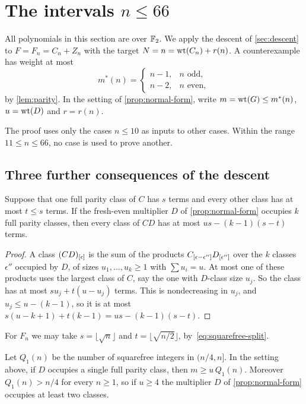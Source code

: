 \section{The intervals \texorpdfstring{$n\le66$}{n <= 66}}\label{sec:small}

All polynomials in this section are over $\mathbb{F}_2$. We apply the descent of \cref{sec:descent} to $F=F_n=C_n+Z_n$ with the target $N=n=\operatorname{wt}(C_n)+r(n)$. A counterexample has weight at most
\[
 m^*(n)=\begin{cases}n-1,&n\text{ odd},\\ n-2,&n\text{ even},\end{cases}
\]
by \cref{lem:parity}. In the setting of \cref{prop:normal-form}, write $m=\operatorname{wt}(G)\le m^*(n)$, $u=\operatorname{wt}(D)$ and $r=r(n)$.

The proof uses only the cases $n\le10$ as inputs to other cases. Within the range $11\le n\le66$, no case is used to prove another.

\subsection{Three further consequences of the descent}

\begin{lemma}\label{lem:dispersed}
Suppose that one full parity class of $C$ has $s$ terms and every other class has at most $t\le s$ terms. If the fresh-even multiplier $D$ of \cref{prop:normal-form} occupies $k$ full parity classes, then every class of $CD$ has at most $us-(k-1)(s-t)$ terms.
\end{lemma}

\begin{proof}
A class $(CD)_{[\epsilon]}$ is the sum of the products $C_{[\epsilon-\epsilon'']}D_{[\epsilon'']}$ over the $k$ classes $\epsilon''$ occupied by $D$, of sizes $u_1,\dots,u_k\ge1$ with $\sum u_i=u$. At most one of these products uses the largest class of $C$, say the one with $D$-class size $u_j$. So the class has at most $su_j+t(u-u_j)$ terms. This is nondecreasing in $u_j$, and $u_j\le u-(k-1)$, so it is at most $s(u-k+1)+t(k-1)=us-(k-1)(s-t)$.
\end{proof}

For $F_n$ we may take $s=\lfloor\sqrt n\rfloor$ and $t=\lfloor\sqrt{n/2}\rfloor$, by~\eqref{eq:squarefree-split}.

\begin{lemma}\label{lem:unit-classes}
Let $Q_1(n)$ be the number of squarefree integers in $(n/4,n]$. In the setting above, if $D$ occupies a single full parity class, then $m\ge u\,Q_1(n)$. Moreover $Q_1(n)>n/4$ for every $n\ge1$, so if $u\ge4$ the multiplier $D$ of \cref{prop:normal-form} occupies at least two classes.
\end{lemma}

